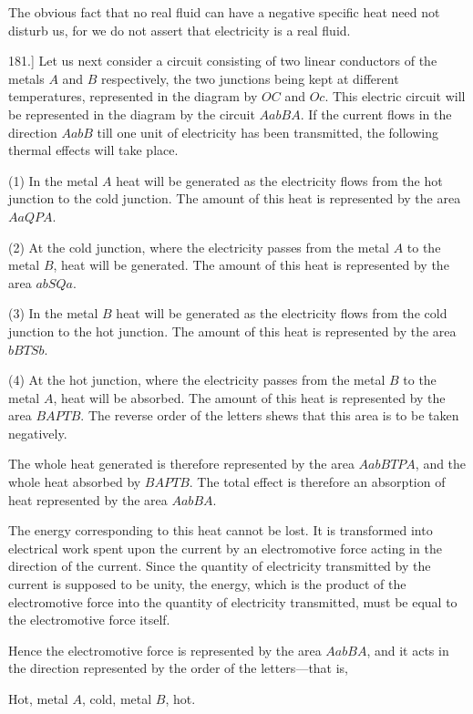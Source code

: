 \documentclass[12pt,oneside]{book}[2021/10/04]
\newcommand{\Runhead}[1]{\fancyhead[C]{\iffloatpage{}{\small#1}}}
\newcommand{\article}[1]{\phantomsection \label{art:#1}{#1.]}}
\newcommand{\¬}{\hphantom{0}}
\begin{document}
The obvious fact that no real fluid can have a negative specific
heat need not disturb us, for we do not assert that electricity is a
real fluid.

\article{181} Let us next consider a circuit consisting of two linear
conductors of the metals \(A\) and \(B\) respectively, the two junctions
being kept at different temperatures, represented in the diagram
by \(OC\) and \(Oc\). This electric circuit will be represented in the
diagram by the circuit \(AabBA\). If the current flows in the
direction \(AabB\) till one unit of electricity has been transmitted,
the following thermal effects will take place.

(1) In the metal \(A\) heat will be generated as the electricity flows
from the hot junction to the cold junction. The amount of this
heat is represented by the area \(AaQPA\).

(2) At the cold junction, where the electricity passes from the
metal \(A\) to the metal \(B\), heat will be generated. The amount of
this heat is represented by the area \(abSQa\).

(3) In the metal \(B\) heat will be generated as the electricity flows
from the cold junction to the hot junction. The amount of this
heat is represented by the area \(bBTSb\).

(4) At the hot junction, where the electricity passes from the
metal \(B\) to the metal \(A\), heat will be absorbed. The amount of
this heat is represented by the area \(BAPTB\). The reverse order of
the letters shews that this area is to be taken negatively.

The whole heat generated is therefore represented by the area
\(AabBTPA\), and the whole heat absorbed by \(BAPTB\). The total
effect is therefore an absorption of heat represented by the area
\(AabBA\).
\Runhead{ELECTROMOTIVE FORCE.}

The energy corresponding to this heat cannot be lost. It is
transformed into electrical work spent upon the current by an
electromotive force acting in the direction of the current. Since
the quantity of electricity transmitted by the current is supposed
to be unity, the energy, which is the product of the electromotive
force into the quantity of electricity transmitted, must be equal to
the electromotive force itself.

Hence the electromotive force is represented by the area \(AabBA\),
and it acts in the direction represented by the order of the letters---that
is,
\begin{center}
Hot, metal \(A\), cold, metal \(B\), hot.
\end{center}
\end{document}
